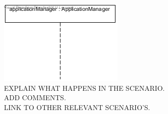     \begin{figure}[!htp]
    	\centering
    	\includegraphics[width=\textwidth]{images/sequence-UC12-UC26-UC27}
    	\caption[Sending actuation commands via a mobile app]{EXPLAIN WHAT HAPPENS IN THE SCENARIO. \\ ADD COMMENTS. \\ LINK TO OTHER RELEVANT SCENARIO'S. }\label{fig:seq_scenario9}
    \end{figure}
